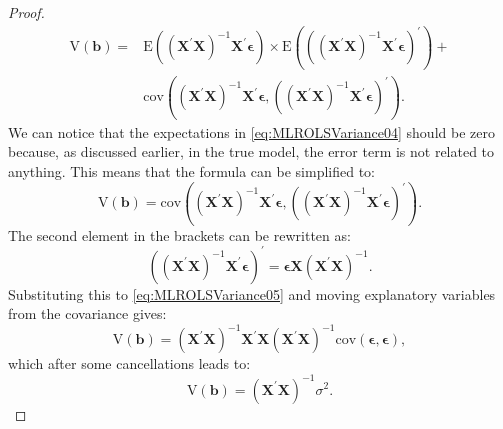 \documentclass[
]{book}
\theoremstyle{definition}
\theoremstyle{definition}
\theoremstyle{definition}
\theoremstyle{definition}
\theoremstyle{remark}
\begin{document}
\begin{proof}
\begin{equation}
\begin{aligned}
\mathrm{V}\left( {\boldsymbol{b}} \right) = 
& \mathrm{E}\left(\left( {\mathbf{X}}^\prime {\mathbf{X}} \right)^{-1} {\mathbf{X}}^\prime {\boldsymbol{\epsilon}} \right) \times \mathrm{E}\left(\left( \left( {\mathbf{X}}^\prime {\mathbf{X}} \right)^{-1} {\mathbf{X}}^\prime {\boldsymbol{\epsilon}} \right)^\prime \right) + \\
& \mathrm{cov} \left(\left( {\mathbf{X}}^\prime {\mathbf{X}} \right)^{-1} {\mathbf{X}}^\prime {\boldsymbol{\epsilon}}, \left( \left( {\mathbf{X}}^\prime {\mathbf{X}} \right)^{-1} {\mathbf{X}}^\prime {\boldsymbol{\epsilon}} \right)^\prime \right).
\end{aligned}
\label{eq:MLROLSVariance04}
\end{equation}
We can notice that the expectations in \eqref{eq:MLROLSVariance04} should be zero because, as discussed earlier, in the true model, the error term is not related to anything. This means that the formula can be simplified to:
\begin{equation}
\mathrm{V}\left( {\boldsymbol{b}} \right) = \mathrm{cov} \left(\left( {\mathbf{X}}^\prime {\mathbf{X}} \right)^{-1} {\mathbf{X}}^\prime {\boldsymbol{\epsilon}}, \left( \left( {\mathbf{X}}^\prime {\mathbf{X}} \right)^{-1} {\mathbf{X}}^\prime {\boldsymbol{\epsilon}} \right)^\prime \right).
\label{eq:MLROLSVariance05}
\end{equation}
The second element in the brackets can be rewritten as:
\begin{equation*}
\left( \left( {\mathbf{X}}^\prime {\mathbf{X}} \right)^{-1} {\mathbf{X}}^\prime {\boldsymbol{\epsilon}} \right)^\prime = {\boldsymbol{\epsilon}} {\mathbf{X}} \left( {\mathbf{X}}^\prime {\mathbf{X}} \right)^{-1} .
\end{equation*}
Substituting this to \eqref{eq:MLROLSVariance05} and moving explanatory variables from the covariance gives:
\begin{equation}
\mathrm{V}\left( {\boldsymbol{b}} \right) = \left( {\mathbf{X}}^\prime {\mathbf{X}} \right)^{-1} {\mathbf{X}}^\prime {\mathbf{X}} \left( {\mathbf{X}}^\prime {\mathbf{X}} \right)^{-1} \mathrm{cov} \left( {\boldsymbol{\epsilon}}, {\boldsymbol{\epsilon}} \right),
\label{eq:MLROLSVariance06}
\end{equation}
which after some cancellations leads to:
\begin{equation}
\mathrm{V}\left( {\boldsymbol{b}} \right) = \left( {\mathbf{X}}^\prime {\mathbf{X}} \right)^{-1} \sigma^2 .
\label{eq:MLROLSVarianceSemiFinal}
\end{equation}

\end{proof}
\end{document}
